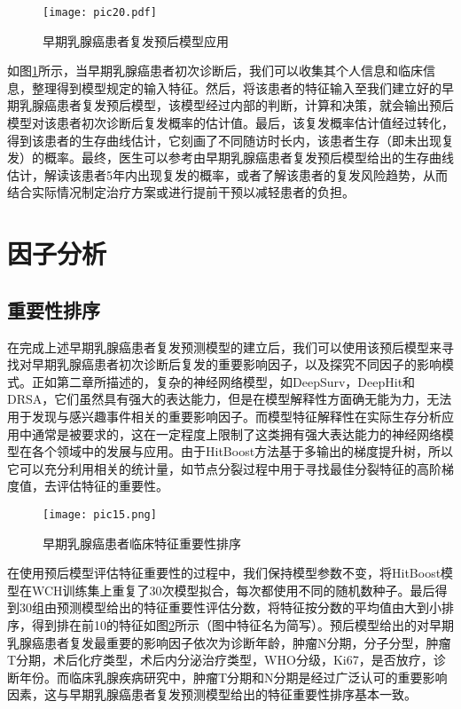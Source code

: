 \begin{figure}[H]
\texttt{[image: pic20.pdf]}
\caption{早期乳腺癌患者复发预后模型应用}
\label{pic20}
\end{figure}

如图\ref{pic20}所示，当早期乳腺癌患者初次诊断后，我们可以收集其个人信息和临床信息，整理得到模型规定的输入特征。然后，将该患者的特征输入至我们建立好的早期乳腺癌患者复发预后模型，该模型经过内部的判断，计算和决策，就会输出预后模型对该患者初次诊断后复发概率的估计值。最后，该复发概率估计值经过转化，得到该患者的生存曲线估计，它刻画了不同随访时长内，该患者生存（即未出现复发）的概率。最终，医生可以参考由早期乳腺癌患者复发预后模型给出的生存曲线估计，解读该患者5年内出现复发的概率，或者了解该患者的复发风险趋势，从而结合实际情况制定治疗方案或进行提前干预以减轻患者的负担。

\section{因子分析}

\subsection{重要性排序}

在完成上述早期乳腺癌患者复发预测模型的建立后，我们可以使用该预后模型来寻找对早期乳腺癌患者初次诊断后复发的重要影响因子，以及探究不同因子的影响模式。正如第二章所描述的，复杂的神经网络模型，如DeepSurv，DeepHit和DRSA，它们虽然具有强大的表达能力，但是在模型解释性方面确无能为力，无法用于发现与感兴趣事件相关的重要影响因子。而模型特征解释性在实际生存分析应用中通常是被要求的，这在一定程度上限制了这类拥有强大表达能力的神经网络模型在各个领域中的发展与应用。由于HitBoost方法基于多输出的梯度提升树，所以它可以充分利用相关的统计量，如节点分裂过程中用于寻找最佳分裂特征的高阶梯度值，去评估特征的重要性。

\begin{figure}[H]
\texttt{[image: pic15.png]}
\caption{早期乳腺癌患者临床特征重要性排序}
\label{pic15}
\end{figure}

在使用预后模型评估特征重要性的过程中，我们保持模型参数不变，将HitBoost模型在WCH训练集上重复了30次模型拟合，每次都使用不同的随机数种子。最后得到30组由预测模型给出的特征重要性评估分数，将特征按分数的平均值由大到小排序，得到排在前10的特征如图\ref{pic15}所示（图中特征名为简写）。预后模型给出的对早期乳腺癌患者复发最重要的影响因子依次为诊断年龄，肿瘤N分期，分子分型，肿瘤T分期，术后化疗类型，术后内分泌治疗类型，WHO分级，Ki67，是否放疗，诊断年份。而临床乳腺疾病研究中，肿瘤T分期和N分期是经过广泛认可的重要影响因素，这与早期乳腺癌患者复发预测模型给出的特征重要性排序基本一致。

